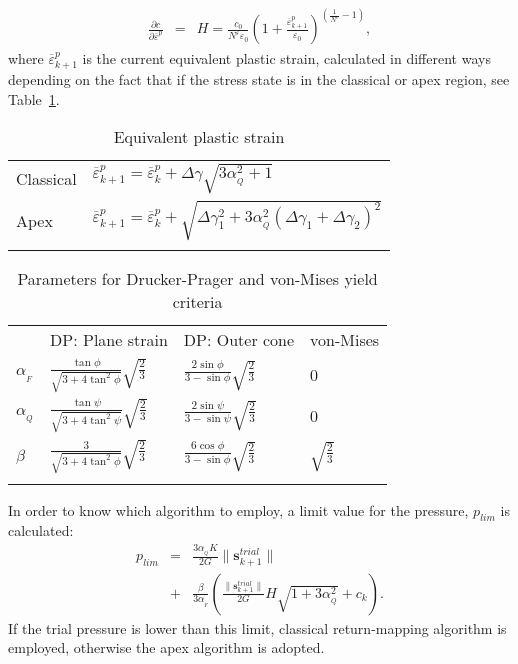 \documentclass[twocolumn]{svjour3}          %
\begin{document}
{\begin{eqnarray}
\nonumber\\
\frac{\partial c}{\partial\overline{\varepsilon}^p} &=& H = \frac{c_{0}}{N^\varepsilon \varepsilon_0}\left( 1+\frac{\overline{\varepsilon}^p_{k+1}}{\varepsilon_0}\right)^{\left( \frac{1}{N^\varepsilon}-1\right) } ,
\end{eqnarray}
where $\overline{\varepsilon}^p_{k+1}$ is the current equivalent plastic strain, calculated in different ways depending on the fact that if the stress state is in the classical or apex region, see  Table~\ref{tab:1}.
\begin{table}
\centering
\caption{Equivalent plastic strain} \label{tab:1}
	\vspace*{0.3cm}
	\begin{tabular}{ll}
	\noalign{\smallskip}\hline\noalign{\smallskip}
	Classical & $
\overline{\varepsilon}^p_{k+1}=\overline{\varepsilon}^p_{k}+\Delta\gamma\sqrt{3\alpha_{_Q}^2+1}
$ \\
Apex & $
\overline{\varepsilon}^p_{k+1}=\overline{\varepsilon}^p_{k}+\sqrt{\Delta\gamma_1^2+3\alpha_{_Q}^2\left(\Delta\gamma_1+\Delta\gamma_2 \right)^2}
$\\
\hline\noalign{\smallskip}
	\end{tabular}
\end{table}
\begin{table}
\centering
\caption{ Parameters for Drucker-Prager and von-Mises yield criteria} \label{tab:2}
	\vspace*{0.3cm}
	\begin{tabular}{llll}
	\hline\noalign{\smallskip}
	& DP: Plane strain & DP: Outer cone & von-Mises \\ 
	\noalign{\smallskip}\hline\noalign{\smallskip}
	$\alpha_{_F}$ & $\frac{\tan\phi}{\sqrt{3+4\tan^2\phi}}\sqrt{\frac{2}{3}}$ & $\frac{2\sin\phi}{3-\sin\phi}\sqrt{\frac{2}{3}}$ & 0 \\
$\alpha_{_Q}$ & $\frac{\tan\psi}{\sqrt{3+4\tan^2\psi}}\sqrt{\frac{2}{3}}$ &
$\frac{2\sin\psi}{3-\sin\psi}\sqrt{\frac{2}{3}} $ & 0\\
$\beta$ & $\frac{3}{\sqrt{3+4\tan^2\phi}}\sqrt{\frac{2}{3}}$ &
$\frac{6\cos\phi}{3-\sin\phi}\sqrt{\frac{2}{3}}$ & $\sqrt{\frac{2}{3}}$\\
\hline\noalign{\smallskip}
	\end{tabular}
\end{table}

In order to know which   algorithm   to employ, a limit value for the pressure, $p_{lim}$ is calculated:
 \begin{eqnarray}
p_{lim}&=&\frac{3\alpha_{_Q}K}{2G}\|\textbf{s}^{trial}_{k+1}\|\nonumber\\ \label{eq_dp8}
&+&\frac{\beta}{3\alpha_{_F}}\left( \frac{\|\textbf{s}^{trial}_{k+1}\|}{2G}H\sqrt{1+3\alpha_{_Q}^2} + c_k \right).
\end{eqnarray}
If the trial pressure is lower than this limit, classical return-mapping algorithm is employed, otherwise the apex algorithm is adopted.  

}
\end{document}
